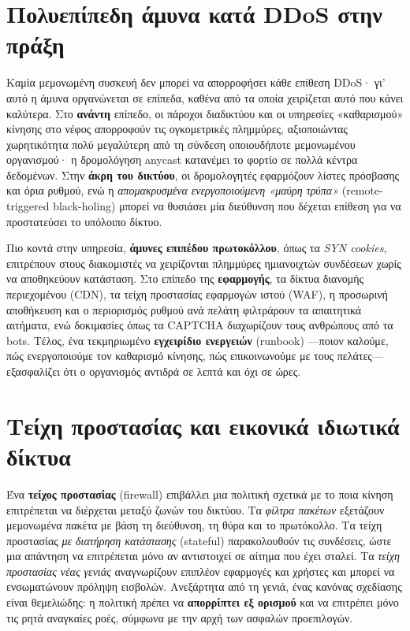 \section{Πολυεπίπεδη άμυνα κατά DDoS στην πράξη}\label{sec:6.4}
Καμία μεμονωμένη συσκευή δεν μπορεί να απορροφήσει κάθε επίθεση DDoS· γι' αυτό η άμυνα οργανώνεται σε επίπεδα, καθένα από τα οποία χειρίζεται αυτό που κάνει καλύτερα. Στο \textbf{ανάντη} επίπεδο, οι πάροχοι διαδικτύου και οι υπηρεσίες «καθαρισμού» κίνησης στο νέφος απορροφούν τις ογκομετρικές πλημμύρες, αξιοποιώντας χωρητικότητα πολύ μεγαλύτερη από τη σύνδεση οποιουδήποτε μεμονωμένου οργανισμού· η δρομολόγηση anycast κατανέμει το φορτίο σε πολλά κέντρα δεδομένων. Στην \textbf{άκρη του δικτύου}, οι δρομολογητές εφαρμόζουν λίστες πρόσβασης και όρια ρυθμού, ενώ η \emph{απομακρυσμένα ενεργοποιούμενη «μαύρη τρύπα»} (remote-triggered black-holing) μπορεί να θυσιάσει μία διεύθυνση που δέχεται επίθεση για να προστατεύσει το υπόλοιπο δίκτυο.

Πιο κοντά στην υπηρεσία, \textbf{άμυνες επιπέδου πρωτοκόλλου}, όπως τα \emph{SYN cookies}, επιτρέπουν στους διακομιστές να χειρίζονται πλημμύρες ημιανοιχτών συνδέσεων χωρίς να αποθηκεύουν κατάσταση. Στο επίπεδο της \textbf{εφαρμογής}, τα δίκτυα διανομής περιεχομένου (CDN), τα τείχη προστασίας εφαρμογών ιστού (WAF), η προσωρινή αποθήκευση και ο περιορισμός ρυθμού ανά πελάτη φιλτράρουν τα απαιτητικά αιτήματα, ενώ δοκιμασίες όπως τα CAPTCHA διαχωρίζουν τους ανθρώπους από τα bots. Τέλος, ένα τεκμηριωμένο \textbf{εγχειρίδιο ενεργειών} (runbook) —ποιον καλούμε, πώς ενεργοποιούμε τον καθαρισμό κίνησης, πώς επικοινωνούμε με τους πελάτες— εξασφαλίζει ότι ο οργανισμός αντιδρά σε λεπτά και όχι σε ώρες.

\section{Τείχη προστασίας και εικονικά ιδιωτικά δίκτυα}\label{sec:6.5}
Ένα \textbf{τείχος προστασίας} (firewall) επιβάλλει μια πολιτική σχετικά με το ποια κίνηση επιτρέπεται να διέρχεται μεταξύ ζωνών του δικτύου. Τα \emph{φίλτρα πακέτων} εξετάζουν μεμονωμένα πακέτα με βάση τη διεύθυνση, τη θύρα και το πρωτόκολλο. Τα τείχη προστασίας \emph{με διατήρηση κατάστασης} (stateful) παρακολουθούν τις συνδέσεις, ώστε μια απάντηση να επιτρέπεται μόνο αν αντιστοιχεί σε αίτημα που έχει σταλεί. Τα \emph{τείχη προστασίας νέας γενιάς} αναγνωρίζουν επιπλέον εφαρμογές και χρήστες και μπορεί να ενσωματώνουν πρόληψη εισβολών. Ανεξάρτητα από τη γενιά, ένας κανόνας σχεδίασης είναι θεμελιώδης: η πολιτική πρέπει να \textbf{απορρίπτει εξ ορισμού} και να επιτρέπει μόνο τις ρητά αναγκαίες ροές, σύμφωνα με την αρχή των ασφαλών προεπιλογών.

